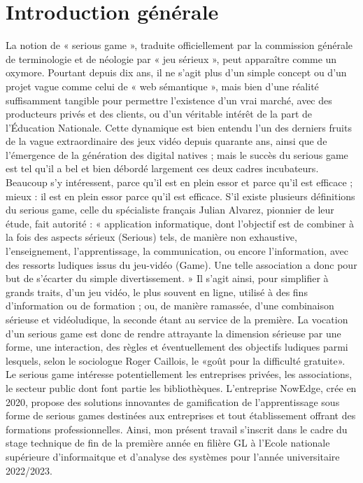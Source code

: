 
\chapter*{Introduction générale}



La notion de « serious game », traduite officiellement par la commission générale de
terminologie et de néologie par « jeu sérieux », peut apparaître comme un oxymore. Pourtant
depuis dix ans, il ne s'agit plus d'un simple concept ou d'un projet vague comme celui de « web
sémantique », mais bien d'une réalité suffisamment tangible pour permettre l'existence d'un vrai
marché, avec des producteurs privés et des clients, ou d'un véritable intérêt de la part de
l’Éducation Nationale. Cette dynamique est bien entendu l’un des derniers fruits de la vague
extraordinaire des jeux vidéo depuis quarante ans, ainsi que de l’émergence de la génération des
digital natives ; mais le succès du serious game est tel qu’il a bel et bien débordé largement ces
deux cadres incubateurs. Beaucoup s’y intéressent, parce qu’il est en plein essor et parce qu’il est
efficace ; mieux : il est en plein essor parce qu’il est efficace.
S'il existe plusieurs définitions du serious game, celle du spécialiste français Julian Alvarez,
pionnier de leur étude, fait autorité : « application informatique, dont l'objectif est de combiner à
la fois des aspects sérieux (Serious) tels, de manière non exhaustive, l'enseignement,
l'apprentissage, la communication, ou encore l'information, avec des ressorts ludiques issus du
jeu-vidéo (Game). Une telle association a donc pour but de s'écarter du simple divertissement. »
Il s'agit ainsi, pour simplifier à grands traits, d'un jeu vidéo, le plus souvent en ligne, utilisé à des
fins d'information ou de formation ; ou, de manière ramassée, d'une combinaison sérieuse et
vidéoludique, la seconde étant au service de la première. La vocation d’un serious game est donc
de rendre attrayante la dimension sérieuse par une forme, une interaction, des règles et
éventuellement des objectifs ludiques parmi lesquels, selon le sociologue Roger Caillois, le «goût
pour la difficulté gratuite». Le serious game intéresse potentiellement les entreprises privées, les
associations, le secteur public dont font partie les bibliothèques.
L’entreprise NowEdge, crée en 2020, propose des solutions innovantes de gamification de
l’apprentissage sous forme de serious games destinées aux entreprises et tout établissement offrant
des formations professionnelles.
Ainsi, mon présent travail s’inscrit dans le cadre du stage technique de fin de la
première année en filière GL à l'Ecole nationale supérieure d'informaitque et d'analyse des systèmes pour
l’année universitaire 2022/2023.
